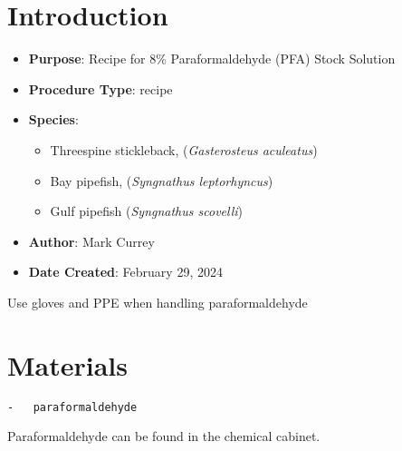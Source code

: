 \documentclass[
  letterpaper,
  DIV=11,
  numbers=noendperiod]{scrreprt}
\providecommand{\tightlist}{%
  \setlength{\itemsep}{0pt}\setlength{\parskip}{0pt}}\usepackage{longtable,booktabs,array}
\begin{document}
\hypertarget{introduction-70}{%
\section{Introduction}\label{introduction-70}}

\begin{itemize}
\tightlist
\item
  \textbf{Purpose}: Recipe for 8\% Paraformaldehyde (PFA) Stock
  Solution\\
\item
  \textbf{Procedure Type}: recipe
\item
  \textbf{Species}:

  \begin{itemize}
  \tightlist
  \item
    Threespine stickleback, (\emph{Gasterosteus aculeatus})
  \item
    Bay pipefish, (\emph{Syngnathus leptorhyncus})
  \item
    Gulf pipefish (\emph{Syngnathus scovelli})
  \end{itemize}
\item
  \textbf{Author}: Mark Currey
\item
  \textbf{Date Created}: February 29, 2024
\end{itemize}

Use gloves and PPE when handling paraformaldehyde

\hypertarget{materials-65}{%
\section{Materials}\label{materials-65}}

\begin{verbatim}
-   paraformaldehyde
\end{verbatim}

\begin{tcolorbox}[enhanced jigsaw, bottomtitle=1mm, rightrule=.15mm, toptitle=1mm, opacitybacktitle=0.6, bottomrule=.15mm, titlerule=0mm, coltitle=black, leftrule=.75mm, arc=.35mm, colback=white, colframe=quarto-callout-note-color-frame, left=2mm, colbacktitle=quarto-callout-note-color!10!white, title=\textcolor{quarto-callout-note-color}{\faInfo}\hspace{0.5em}{Note}, toprule=.15mm, opacityback=0, breakable]

Paraformaldehyde can be found in the chemical cabinet.

\end{tcolorbox}
\end{document}
